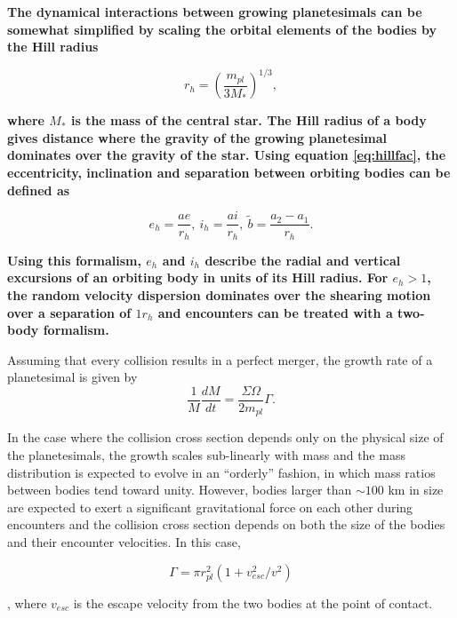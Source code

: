 \documentclass[twocolumn,linenumbers]{aastex63}
\begin{document}
\textbf{The dynamical interactions between growing planetesimals can be somewhat simplified by scaling the orbital elements of the bodies by
the Hill radius}

\begin{equation}\label{eq:hillfac}
	r_{h} = \left(\frac{m_{pl}}{3 M_{*}}\right)^{1/3}, 
\end{equation}

\textbf{\noindent where $M_{*}$ is the mass of the central star. The Hill radius of a body gives distance where the gravity of the growing planetesimal dominates over the gravity of the star. Using equation \ref{eq:hillfac}, the eccentricity, inclination and separation between orbiting bodies can be defined as}

\begin{equation}\label{eq:hillorb}
	e_{h} = \frac{a e}{r_{h}}, \: i_{h} = \frac{a i}{r_{h}}, \: \tilde{b} = \frac{a_{2} - a_{1}}{r_{h}}.
\end{equation}

\textbf{Using this formalism, $e_{h}$ and $i_{h}$ describe the radial and vertical excursions of an orbiting body in units of its Hill radius. For $e_{h} > 1$, the random velocity dispersion dominates over the shearing motion over a separation of $1 r_{h}$ and encounters can be treated with a two-body formalism.}

Assuming that every collision results in a perfect merger, the growth rate of a planetesimal is given by
\begin{equation}\label{eq:growth}
	\frac{1}{M}\frac{dM}{dt} = \frac{\Sigma \Omega}{2 m_{pl}} \Gamma.
\end{equation}

In the case where the collision cross section depends only
on the physical size of the planetesimals, the growth scales sub-linearly
with mass and the mass distribution is expected to evolve in an
``orderly'' fashion, in which mass ratios between bodies tend toward unity. However, bodies larger than $\sim 100$ km in size are expected to exert a significant gravitational force on each other during encounters and the collision cross section depends on both the size of the bodies and their encounter velocities. In this case, 

\begin{equation}\label{eq:gravfocus}
	\Gamma = \pi r_{pl}^2 \left( 1 + v_{esc}^2 / v^2 \right)
\end{equation}

\citep{safronov69}, where $v_{esc}$ is the escape velocity from the two bodies at the point of contact.
\end{document}
